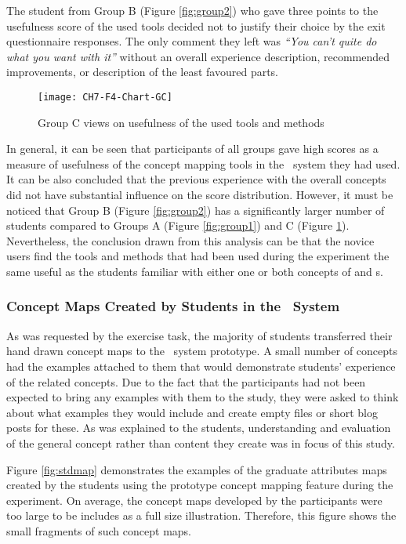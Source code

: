 The student from Group B (Figure \ref{fig:group2}) who gave three points to the
usefulness score of the used tools decided not to justify their choice by the
exit questionnaire responses. The only comment they left was \textit{``You can't
quite do what you want with it''} without an overall experience description,
recommended improvements, or description of the least favoured parts.

\begin{figure}[htb]
\centering
\texttt{[image: CH7-F4-Chart-GC]}
\caption{Group C views on usefulness of the used tools and methods}
\label{fig:group3}
\end{figure}

\FloatBarrier

In general, it can be seen that participants of all groups gave high scores as a
measure of usefulness of the concept mapping tools in the \ep~system they had
used. It can be also concluded that the previous experience with the overall
concepts did not have substantial influence on the score distribution. However,
it must be noticed that Group B (Figure \ref{fig:group2}) has a significantly
larger number of students compared to Groups A (Figure \ref{fig:group1}) and C
(Figure \ref{fig:group3}). Nevertheless, the conclusion drawn from this analysis
can be that the novice users find the tools and methods that had been used
during the experiment the same useful as the students familiar with either one
or both concepts of \LLLs and \ep s.

\subsubsection{Concept Maps Created by Students in the \ep~System}

As was requested by the exercise task, the majority of students transferred
their hand drawn concept maps to the \ep~system prototype. A small number of
concepts had the examples attached to them that would demonstrate students'
experience of the related concepts. Due to the fact that the participants had
not been expected to bring any examples with them to the study, they were asked
to think about what examples they would include and create empty files or short
blog posts for these. As was explained to the students, understanding and
evaluation of the general concept rather than content they create was in focus
of this study.

Figure \ref{fig:stdmap} demonstrates the examples of the graduate attributes
maps created by the students using the prototype concept mapping feature during
the experiment. On average, the concept maps developed by the participants were
too large to be includes as a full size illustration. Therefore, this figure
shows the small fragments of such concept maps.

